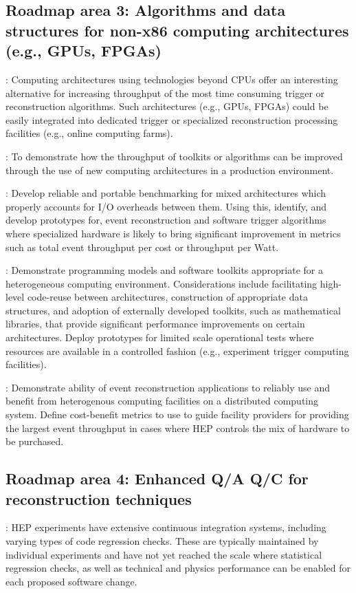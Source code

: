 \subsection{Roadmap area 3: Algorithms and data structures for non-x86 computing architectures (e.g., GPUs, FPGAs)}
: Computing architectures using technologies beyond CPUs offer an interesting alternative for increasing throughput of the most time consuming trigger or reconstruction algorithms. Such architectures (e.g., GPUs, FPGAs) could be easily integrated into dedicated trigger or specialized reconstruction processing facilities (e.g., online computing farms).

\vskip 0.5cm
: To demonstrate how the throughput of toolkits or algorithms can be improved through the use of new computing architectures in a production environment. 

\vskip 0.5cm
: Develop reliable and portable benchmarking for mixed architectures which properly accounts for I/O overheads between them. Using this, identify, and develop prototypes for, event reconstruction and software trigger algorithms where specialized hardware is likely to bring significant improvement in metrics such as total event throughput per cost or throughput per Watt. 

\vskip 0.5cm
: Demonstrate programming models and software toolkits appropriate for a heterogeneous computing environment. Considerations include facilitating high-level code-reuse between architectures, construction of appropriate data structures, and adoption of externally developed toolkits, such as mathematical libraries, that provide significant performance improvements on certain architectures. Deploy prototypes for limited scale operational tests where resources are available in a controlled fashion (e.g., experiment trigger computing facilities).

\vskip 0.5cm
: Demonstrate ability of event reconstruction applications to reliably use and benefit from heterogenous computing facilities on a distributed computing system. Define cost-benefit metrics to use to guide facility providers for providing the largest event throughput in cases where HEP controls the mix of hardware to be purchased.

\subsection{Roadmap area 4: Enhanced Q/A Q/C for reconstruction techniques}
: HEP experiments have extensive continuous integration systems, including varying types of code regression checks. These are typically maintained by individual experiments and have not yet reached the scale where statistical regression checks, as well as technical and physics performance can be enabled for each proposed software change.

